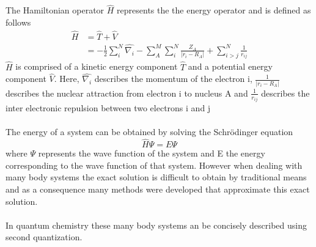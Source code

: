 \documentclass[12pt]{article}
\begin{document}
The Hamiltonian operator $\hat{H}$ represents the the energy operator  and is defined as follows
\begin{equation}
\begin{split}
\hat{H} & = \hat{T} + \hat{V} \\
& = -\frac{1}{2}\sum_{i}^{N} \hat{\nabla_i} -\sum_{A}^{M}\sum_{i}^{N} \frac{Z_A}{\lvert r_i - R_A \rvert} + \sum_{i>j}^{N} \frac{1}{r_{ij}}
\end{split} 
\end{equation}
$\hat{H}$ is comprised of a kinetic energy component $\hat{T}$ and a potential energy component $\hat{V}$. Here, $\hat{\nabla_i}$ describes the momentum of the electron i, $\frac{1}{\lvert r_i - R_A \rvert}$ describes the nuclear attraction from electron i to nucleus A and  $\frac{1}{r_{ij}}$ describes the inter electronic repulsion between two electrons i and j
\\
\\
The energy of a system can be obtained by solving the Schrödinger equation 
\begin{equation}
\hat{H}\Psi = E\Psi
\end{equation}
where $\Psi$ represents the wave function of the system and E the energy corresponding to the wave function of that system. However when dealing with many body systems the exact solution is difficult to obtain by traditional means and as a consequence many methods were developed that approximate this exact solution.\cite{Surj1989}
\\
\\
In quantum chemistry these many body systems an be concisely described using second quantization.  
\end{document}
